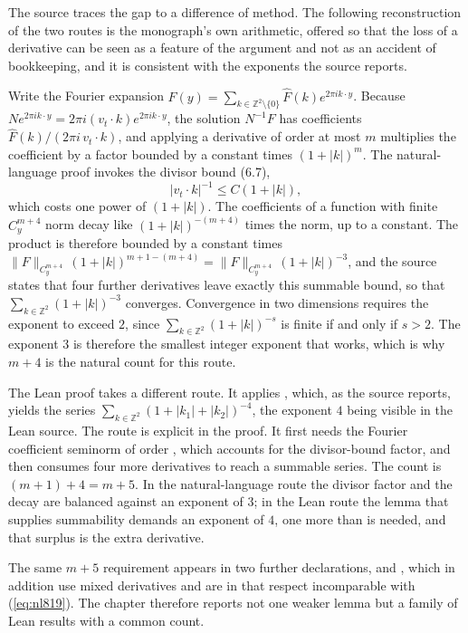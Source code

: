 The source traces the gap to a difference of method. The following reconstruction of the two routes is the monograph's own arithmetic, offered so that the loss of a derivative can be seen as a feature of the argument and not as an accident of bookkeeping, and it is consistent with the exponents the source reports.

Write the Fourier expansion $F(y) = \sum_{k \in \mathbb{Z}^2 \setminus \{0\}} \hat{F}(k) e^{2\pi i k \cdot y}$. Because $N e^{2\pi i k \cdot y} = 2\pi i (v_t \cdot k) e^{2\pi i k \cdot y}$, the solution $N^{-1}F$ has coefficients $\hat{F}(k) / (2\pi i\, v_t \cdot k)$, and applying a derivative of order at most $m$ multiplies the coefficient by a factor bounded by a constant times $(1+|k|)^m$. The natural-language proof invokes the divisor bound (6.7),
\[
|v_t \cdot k|^{-1} \le C (1 + |k|),
\]
which costs one power of $(1+|k|)$. The coefficients of a function with finite $C^{m+4}_y$ norm decay like $(1+|k|)^{-(m+4)}$ times the norm, up to a constant. The product is therefore bounded by a constant times $\|F\|_{C^{m+4}_y}\,(1+|k|)^{m + 1 - (m+4)} = \|F\|_{C^{m+4}_y}\,(1+|k|)^{-3}$, and the source states that four further derivatives leave exactly this summable bound, so that $\sum_{k \in \mathbb{Z}^2} (1+|k|)^{-3}$ converges. Convergence in two dimensions requires the exponent to exceed $2$, since $\sum_{k \in \mathbb{Z}^2} (1+|k|)^{-s}$ is finite if and only if $s > 2$. The exponent $3$ is therefore the smallest integer exponent that works, which is why $m+4$ is the natural count for this route.

The Lean proof takes a different route. It applies , which, as the source reports, yields the series $\sum_{k \in \mathbb{Z}^2} (1 + |k_1| + |k_2|)^{-4}$, the exponent $4$ being visible in the Lean source. The route is explicit in the proof. It first needs the Fourier coefficient seminorm of order , which accounts for the divisor-bound factor, and  then consumes four more derivatives to reach a summable series. The count is $(m+1) + 4 = m+5$. In the natural-language route the divisor factor and the decay are balanced against an exponent of $3$; in the Lean route the lemma that supplies summability demands an exponent of $4$, one more than is needed, and that surplus is the extra derivative.

The same $m+5$ requirement appears in two further declarations,  and , which in addition use mixed derivatives and are in that respect incomparable with (\ref{eq:nl819}). The chapter therefore reports not one weaker lemma but a family of Lean results with a common count.

